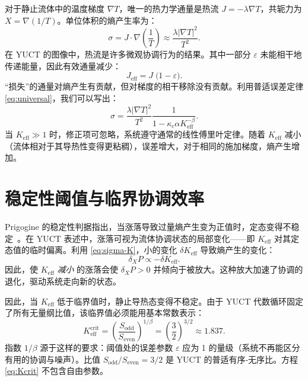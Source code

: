 \documentclass[12pt,a4paper]{article}
\begin{document}
	对于静止流体中的温度梯度 \(\nabla T\)，唯一的热力学通量是热流 \(J = -\lambda \nabla T\)，共轭力为 \(X = \nabla(1/T)\)。单位体积的熵产生率为：
	\begin{equation}\label{eq:sigma}
		\sigma = J \cdot \nabla\left(\frac{1}{T}\right) \approx \frac{\lambda |\nabla T|^2}{T^2}.
	\end{equation}
	在 YUCT 的图像中，热流是许多微观协调行为的结果。其中一部分 \(\varepsilon\) 未能相干地传递能量，因此有效通量减少：
	\begin{equation}\label{eq:J-effective}
		J_{\mathrm{eff}} = J \; \bigl(1 - \varepsilon\bigr).
	\end{equation}
	“损失”的通量对熵产生有贡献，但对梯度的相干移除没有贡献。利用普适误差定律 \eqref{eq:universal}，我们可以写出：
	\begin{equation}\label{eq:sigma-K}
		\sigma = \frac{\lambda |\nabla T|^2}{T^2} \frac{1}{1 - \kappa_c\alpha K_{\mathrm{eff}}^{-\beta}}.
	\end{equation}
	当 \(K_{\mathrm{eff}} \gg 1\) 时，修正项可忽略，系统遵守通常的线性傅里叶定律。随着 \(K_{\mathrm{eff}}\) 减小（流体相对于其导热性变得更粘稠），误差增大，对于相同的施加梯度，熵产生增加。
	
	\section{稳定性阈值与临界协调效率}
	
	Prigogine 的稳定性判据指出，当涨落导致过量熵产生变为正值时，定态变得不稳定~\cite{Glansdorff1971}。在 YUCT 表述中，涨落可视为流体协调状态的局部变化——即 \(K_{\mathrm{eff}}\) 对其定态值的临时偏离。利用 \eqref{eq:sigma-K}，小的变化 \(\delta K_{\mathrm{eff}}\) 导致熵产生的变化：
	\begin{equation}
		\delta_X P \propto - \delta K_{\mathrm{eff}}.
	\end{equation}
	因此，使 \(K_{\mathrm{eff}}\) \emph{减小} 的涨落会使 \(\delta_X P > 0\) 并倾向于被放大。这种放大加速了协调的退化，驱动系统走向新的状态。
	
	因此，当 \(K_{\mathrm{eff}}\) 低于临界值时，静止导热态变得不稳定。由于 YUCT 代数循环固定了所有无量纲比值，该临界值必须能用基本常数表示：
	\begin{equation}\label{eq:Kcrit}
		K_{\mathrm{eff}}^{\mathrm{crit}} = \left( \frac{S_{\mathrm{odd}}}{S_{\mathrm{even}}} \right)^{1/\beta}
		= \left( \frac{3}{2} \right)^{3/2} \approx 1.837.
	\end{equation}
	指数 \(1/\beta\) 源于这样的要求：阈值处的误差参数 \(\varepsilon\) 应为 1 的量级（系统不再能区分有用的协调与噪声）。比值 \(S_{\mathrm{odd}}/S_{\mathrm{even}} = 3/2\) 是 YUCT 的普适有序‑无序比。方程 \eqref{eq:Kcrit} 不包含自由参数。
	
\end{document}
